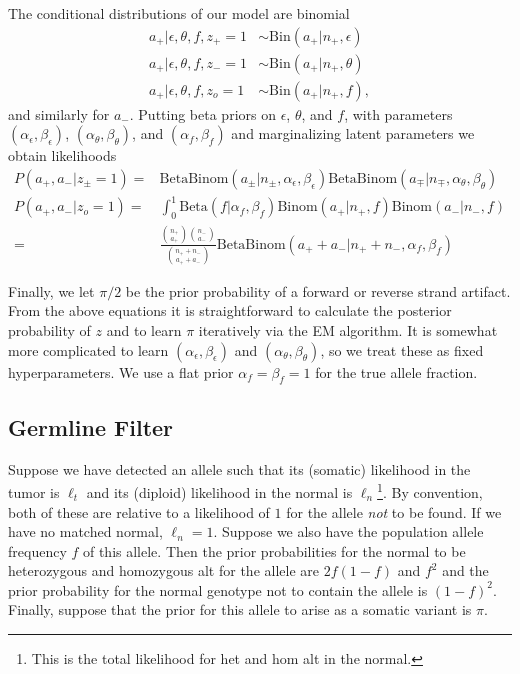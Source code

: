 \documentclass[nofootinbib,amssymb,amsmath]{revtex4}
\begin{document}
The conditional distributions of our model are binomial
\begin{align}
a_+ | \epsilon, \theta, f, z_+ = 1 &\sim \text{Bin} (a_+ | n_+, \epsilon) \\
a_+ | \epsilon, \theta, f, z_- = 1 &\sim \text{Bin} (a_+ | n_+, \theta) \\
a_+ | \epsilon, \theta, f, z_o = 1 &\sim \text{Bin} (a_+ | n_+, f),
\end{align}
and similarly for $a_-$.  Putting beta priors on $\epsilon$, $\theta$, and $f$, with parameters $(\alpha_\epsilon, \beta_\epsilon)$, $(\alpha_\theta, \beta_\theta)$, and $(\alpha_f, \beta_f)$ and marginalizing latent parameters we obtain likelihoods
\begin{align}
P(a_+, a_- | z_\pm = 1) =& \text{BetaBinom}(a_\pm | n_\pm, \alpha_\epsilon, \beta_\epsilon) \text{BetaBinom}(a_\mp | n_\mp, \alpha_\theta, \beta_\theta) \\
P(a_+, a_- | z_o = 1) =& \int_0^1 \text{Beta}(f | \alpha_f, \beta_f) \text{Binom}(a_+ | n_+, f) \text{Binom}(a_- | n_-, f) \\ 
                                  =& \frac{ \binom{n_+}{a_+} \binom{n_-}{a_-}}{\binom{n_+ + n_-}{a_+ + a_-}} \text{BetaBinom}(a_+ + a_- | n_+ + n_-, \alpha_f, \beta_f)
\end{align}

Finally, we let $\pi/2$ be the prior probability of a forward or reverse strand artifact.  From the above equations it is straightforward to calculate the posterior probability of $z$ and to learn $\pi$ iteratively via the EM algorithm.  It is somewhat more complicated to learn $(\alpha_\epsilon, \beta_\epsilon)$ and $(\alpha_\theta, \beta_\theta)$, so we treat these as fixed hyperparameters.  We use a flat prior $\alpha_f = \beta_f = 1$ for the true allele fraction.

\subsection{Germline Filter}\label{germline-filter}
Suppose we have detected an allele such that its (somatic) likelihood in the tumor is $\ell_t$ and its (diploid) likelihood in the normal is $\ell_n$\footnote{This is the total likelihood for het and hom alt in the normal.}.  By convention, both of these are relative to a likelihood of $1$ for the allele \textit{not} to be found.  If we have no matched normal, $\ell_n = 1$.  Suppose we also have the population allele frequency $f$ of this allele.  Then the prior probabilities for the normal to be heterozygous and homozygous alt for the allele are $2f(1-f)$ and $f^2$ and the prior probability for the normal genotype not to contain the allele is $(1-f)^2$.  Finally, suppose that the prior for this allele to arise as a somatic variant is $\pi$.
\end{document}

